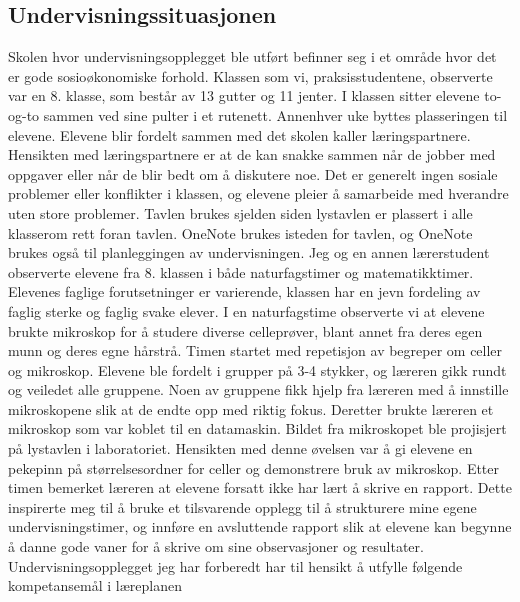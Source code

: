 \documentclass[main.tex]{subfiles}
\begin{document}
\subsection*{Undervisningssituasjonen}
Skolen hvor undervisningsopplegget ble utført befinner seg i et område hvor det er gode 
sosioøkonomiske forhold. Klassen som vi, praksisstudentene, observerte var en 8. klasse, som består 
av 13 gutter og 11 jenter. I klassen sitter elevene to-og-to sammen ved sine pulter i et rutenett. 
Annenhver uke byttes plasseringen til elevene. Elevene blir fordelt sammen med det skolen kaller 
læringspartnere. Hensikten med læringspartnere er at de kan snakke sammen når de jobber med oppgaver 
eller når de blir bedt om å diskutere noe.  Det er generelt ingen sosiale problemer 
eller konflikter i klassen, og elevene pleier å samarbeide med hverandre uten store problemer. Tavlen 
brukes sjelden siden lystavlen er plassert i alle klasserom rett foran tavlen. OneNote brukes isteden 
for tavlen, og OneNote brukes også til planleggingen av undervisningen.
\newline
\newline
Jeg og en annen lærerstudent observerte elevene fra 8. klassen i både naturfagstimer og 
matematikktimer. Elevenes faglige forutsetninger er varierende, klassen har en jevn fordeling av 
faglig sterke og faglig svake elever. I en naturfagstime observerte vi at elevene brukte mikroskop 
for å studere diverse celleprøver, blant annet fra deres egen munn og deres egne hårstrå. Timen 
startet med repetisjon av begreper om celler og mikroskop. Elevene ble fordelt i grupper på 3-4 
stykker, og læreren gikk rundt og veiledet alle gruppene. Noen av gruppene fikk 
hjelp fra læreren med å innstille mikroskopene slik at de endte opp med riktig fokus. Deretter brukte 
læreren et mikroskop som var koblet til en datamaskin. Bildet fra mikroskopet ble projisjert på 
lystavlen i laboratoriet. Hensikten med denne øvelsen var å gi elevene en pekepinn på 
størrelsesordner for celler og demonstrere bruk av mikroskop. Etter timen bemerket læreren at 
elevene forsatt ikke har lært å skrive en rapport. Dette inspirerte meg til å bruke et tilsvarende 
opplegg til å strukturere mine egene undervisningstimer, og innføre en avsluttende rapport 
slik at elevene kan begynne å danne gode vaner for å skrive om sine observasjoner og resultater.
\newline
\newline
Undervisningsopplegget jeg har forberedt har til hensikt å utfylle følgende kompetansemål i 
læreplanen
\end{document}
